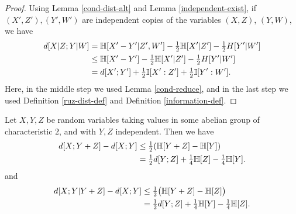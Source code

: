 \begin{proof}
Using Lemma \ref{cond-dist-alt} and Lemma \ref{independent-exist}, if $(X',Z'), (Y',W')$ are independent copies of the variables $(X,Z)$, $(Y,W)$, we have
\begin{align*}
  d[X  | Z; Y | W]&= \mathbb{H}[X'-Y'|Z',W'] - \tfrac{1}{2} \mathbb{H}[X'|Z'] - \tfrac{1}{2}H[Y'|W'] \\
                       &\le \mathbb{H}[X'-Y']- \tfrac{1}{2} \mathbb{H}[X'|Z'] - \tfrac{1}{2}H[Y'|W'] \\
                       &= d[X';Y'] + \tfrac{1}{2}  \mathbb{I}[X' : Z'] + \tfrac{1}{2}  \mathbb{I}[Y' : W'].
\end{align*}
Here, in the middle step we used Lemma \ref{cond-reduce}, and in the last step we used Definition \ref{ruz-dist-def} and Definition \ref{information-def}.
\end{proof}

\begin{lemma}\label{first-useful}
  \leanok
  Let $X, Y, Z$ be random variables taking values in some abelian group of characteristic $2$, and with $Y, Z$ independent. Then we have
  \begin{align}\nonumber d[X; Y + Z] -d[X; Y] &  \leq \tfrac{1}{2} (\mathbb{H}[Y+Z] - \mathbb{H}[Y]) \\ & = \tfrac{1}{2} d[Y; Z] + \tfrac{1}{4} \mathbb{H}[Z] - \tfrac{1}{4} \mathbb{H}[Y]. \label{lem51-a} \end{align}
  and
  \begin{align}\nonumber
  d[X;Y|Y+Z] - d[X;Y] & \leq \tfrac{1}{2} \bigl(\mathbb{H}[Y+Z] - \mathbb{H}[Z]\bigr) \\ & = \tfrac{1}{2} d[Y;Z] + \tfrac{1}{4} \mathbb{H}[Y] - \tfrac{1}{4} \mathbb{H}[Z].
    \label{ruzsa-3}
  \end{align}
  \end{lemma}


